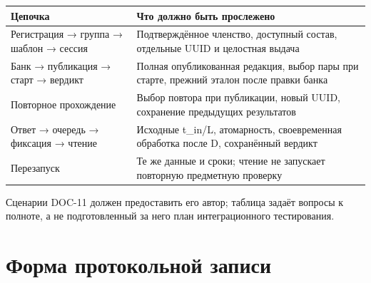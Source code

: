 \documentclass[12pt,a4paper]{article}
\newcounter{none} %
\begin{document}
{\def\LTcaptype{none} %
\begin{longtable}[]{@{}
  >{\raggedright\arraybackslash}p{}
  >{\raggedright\arraybackslash}p{}@{}}
\toprule\noalign{}
\begin{minipage}[b]{\linewidth}\raggedright
Цепочка
\end{minipage} & \begin{minipage}[b]{\linewidth}\raggedright
Что должно быть прослежено
\end{minipage} \\
\midrule\noalign{}
\endhead
\bottomrule\noalign{}
\endlastfoot
Регистрация → группа → шаблон → сессия & Подтверждённое членство, доступный состав, отдельные UUID и целостная выдача \\
Банк → публикация → старт → вердикт & Полная опубликованная редакция, выбор пары при старте, прежний эталон после правки банка \\
Повторное прохождение & Выбор повтора при публикации, новый UUID, сохранение предыдущих результатов \\
Ответ → очередь → фиксация → чтение & Исходные t\_in/L, атомарность, своевременная обработка после D, сохранённый вердикт \\
Перезапуск & Те же данные и сроки; чтение не запускает повторную предметную проверку \\
\end{longtable}
}

Сценарии DOC-11 должен предоставить его автор; таблица задаёт вопросы к полноте, а не подготовленный за него план интеграционного тестирования.

\section{Форма протокольной записи}\label{ux444ux43eux440ux43cux430-ux43fux440ux43eux442ux43eux43aux43eux43bux44cux43dux43eux439-ux437ux430ux43fux438ux441ux438}

\hypertarget{форма-протокольной-записи}{}
\end{document}
